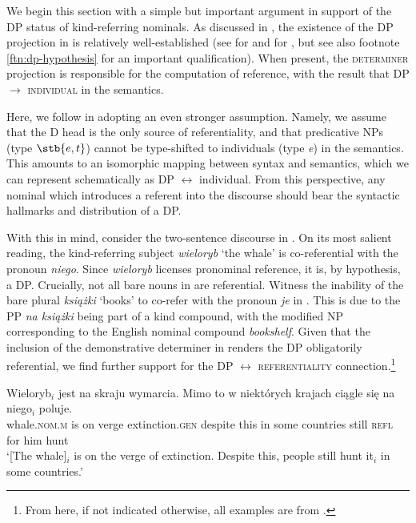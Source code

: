 \documentclass[output=paper]{langscibook}
\begin{document}
We begin this section with a simple but important argument in support of the DP status of kind-referring nominals. As discussed in , the existence of the DP projection in  is relatively well-established (see \citealt{Willim2000} for  and \citealt{Pereltsvaig2007} for , but see also footnote \ref{ftn:dp-hypothesis} for an important qualification). When present, the \textsc{determiner} projection is responsible for the computation of reference, with the result that DP $\rightarrow$ \textsc{individual} in the semantics.

\begin{sloppypar}
Here, we follow \citet{Borer2005} in adopting an even stronger assumption. Namely, we assume that the D head is the only source of referentiality, and that predicative NPs (type $\stb{e,t}$) cannot be type-shifted to individuals (type \textit{e}) in the semantics. This amounts to an isomorphic mapping between syntax and semantics, which we can represent schematically as DP $\leftrightarrow$ individual. From this perspective, any nominal which introduces a referent into the discourse should bear the syntactic hallmarks and distribution of a DP.\end{sloppypar}

With this in mind, consider the two-sentence discourse in . On its most salient reading, the kind-referring subject \textit{wieloryb} `the whale' is co-referential with the pronoun \textit{niego}. Since \textit{wieloryb} licenses pronominal reference, it is, by hypothesis, a DP. Crucially, not all bare nouns in  are referential. Witness the inability of the bare plural \textit{książki} `books' to co-refer with the pronoun \textit{je} in . This is due to the PP \textit{na książki} being part of a kind compound, with the modified NP corresponding to the English nominal compound \textit{bookshelf}. Given that the inclusion of the demonstrative determiner in  renders the DP obligatorily referential, we find further support for the DP $\leftrightarrow$ \textsc{referentiality} connection.\footnote{From here, if not indicated otherwise, all examples are from .}\largerpage

\ea \gll
Wieloryb$_i$ jest na skraju wymarcia. Mimo to w niektórych krajach ciągle się na niego$_i$ poluje.\\
whale.\textsc{nom.m} is on verge extinction.\textsc{gen} despite this in some countries still \textsc{refl} for him hunt\\
\glt `[The whale]$_i$ is on the verge of extinction. Despite this, people still hunt it$_i$ in some countries.' \label{ex:whale_ref}
\ex {}
\label{ex:bookshelf_1}
\end{document}
